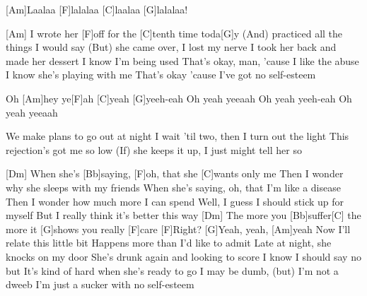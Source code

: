 

\begin{guitar}
	[Am]Laalaa [F]lalalaa [C]laalaa [G]lalalaa!
	
	[Am] I wrote her [F]off for the [C]tenth time toda[G]y
	(And) practiced all the things I would say
	(But) she came over, I lost my nerve
	I took her back and made her dessert
	I know I'm being used
	That's okay, man, 'cause I like the abuse
	I know she's playing with me
	That's okay 'cause I've got no self-esteem
	
	Oh [Am]hey ye[F]ah [C]yeah [G]yeeh-eah
	Oh yeah yeeaah
	Oh yeah yeeh-eah
	Oh yeah yeeaah
	
	We make plans to go out at night
	I wait 'til two, then I turn out the light
	This rejection's got me so low
	(If) she keeps it up, I just might tell her so
	
	 
	
	[Dm] When she's [Bb]saying, [F]oh, that she [C]wants only me
	Then I wonder why she sleeps with my friends
	When she's saying, oh, that I'm like a disease
	Then I wonder how much more I can spend
	Well, I guess I should stick up for myself
	But I really think it's better this way
	[Dm] The more you [Bb]suffer[C] the more it [G]shows you really [F]care
	[F]Right? [G]Yeah, yeah, [Am]yeah
	\pagebreak
	Now I'll relate this little bit
	Happens more than I'd like to admit
	Late at night, she knocks on my door
	She's drunk again and looking to score
	I know I should say no but
	It's kind of hard when she's ready to go
	I may be dumb, (but) I'm not a dweeb
	I'm just a sucker with no self-esteem
	
	 
	
	 
\end{guitar}